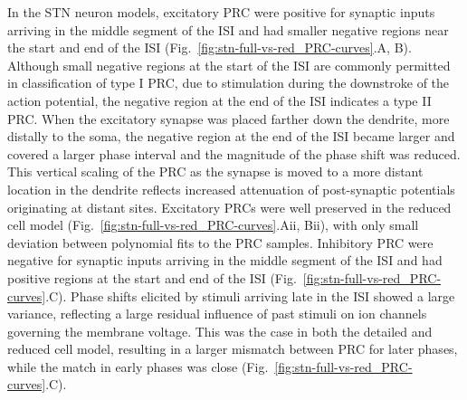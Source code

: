 %
In the STN neuron models, excitatory PRC were positive for synaptic inputs
arriving in the middle segment of the ISI and had smaller negative regions
near the start and end of the ISI (Fig.~\ref{fig:stn-full-vs-red_PRC-curves}.A, B). %
Although small negative regions at the start of the ISI are commonly permitted in
classification of type I PRC, due to stimulation during the downstroke of the
action potential, the negative region at the end of the ISI indicates a type II PRC.
When the excitatory synapse was placed farther down the dendrite, more distally to the soma,
the negative region at the end of the ISI became larger and covered a larger phase
interval and the magnitude of the phase shift was reduced. This vertical scaling
of the PRC as the synapse is moved to a more distant location in the dendrite
reflects increased attenuation of post-synaptic potentials originating at distant
sites.
%
Excitatory PRCs were well preserved in the reduced cell model
(Fig.~\ref{fig:stn-full-vs-red_PRC-curves}.Aii, Bii), with only small deviation
between polynomial fits to the PRC samples.
%
Inhibitory PRC were negative for synaptic inputs arriving in the middle segment
of the ISI and had positive regions at the start and end of the ISI
(Fig.~\ref{fig:stn-full-vs-red_PRC-curves}.C). Phase shifts elicited by stimuli
arriving late in the ISI showed a large variance, reflecting a large residual
influence of past stimuli on ion channels governing the membrane voltage. %
This was the case in both the detailed and reduced cell model, resulting
in a larger mismatch between PRC for later phases, while the match in early
phases was close (Fig.~\ref{fig:stn-full-vs-red_PRC-curves}.C).

